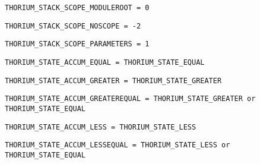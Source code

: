 \begin{verbatim}
THORIUM_STACK_SCOPE_MODULEROOT = 0
\end{verbatim}
\label{thoriumcore:thorium:thoriumstackscopemoduleroot}



\begin{verbatim}
THORIUM_STACK_SCOPE_NOSCOPE = -2
\end{verbatim}
\label{thoriumcore:thorium:thoriumstackscopenoscope}



\begin{verbatim}
THORIUM_STACK_SCOPE_PARAMETERS = 1
\end{verbatim}
\label{thoriumcore:thorium:thoriumstackscopeparameters}



\begin{verbatim}
THORIUM_STATE_ACCUM_EQUAL = THORIUM_STATE_EQUAL
\end{verbatim}
\label{thoriumcore:thorium:thoriumstateaccumequal}



\begin{verbatim}
THORIUM_STATE_ACCUM_GREATER = THORIUM_STATE_GREATER
\end{verbatim}
\label{thoriumcore:thorium:thoriumstateaccumgreater}



\begin{verbatim}
THORIUM_STATE_ACCUM_GREATEREQUAL = THORIUM_STATE_GREATER or THORIUM_STATE_EQUAL
\end{verbatim}
\label{thoriumcore:thorium:thoriumstateaccumgreaterequal}



\begin{verbatim}
THORIUM_STATE_ACCUM_LESS = THORIUM_STATE_LESS
\end{verbatim}
\label{thoriumcore:thorium:thoriumstateaccumless}



\begin{verbatim}
THORIUM_STATE_ACCUM_LESSEQUAL = THORIUM_STATE_LESS or THORIUM_STATE_EQUAL
\end{verbatim}
\label{thoriumcore:thorium:thoriumstateaccumlessequal}



